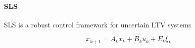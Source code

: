 \documentclass{l4dc2026}
\newcommand{\tvd}{d_\textrm{TV}}
\newcommand{\glen}[1]{{\textcolor[rgb]{1,0,0}{\textsf{[Glen: {#1}]}}}}
\begin{document}

\vspace{-8pt}
\paragraph{SLS} SLS \citep{anderson2019system} is a robust control framework for uncertain LTV systems

\vspace{-10pt}
\begin{equation}\label{eq:ltv_dynamics}
x_{k+1} = A_kx_{k} + B_ku_{k} + E_k\xi_k    
\end{equation}
\vspace{-15pt}
\end{document}
